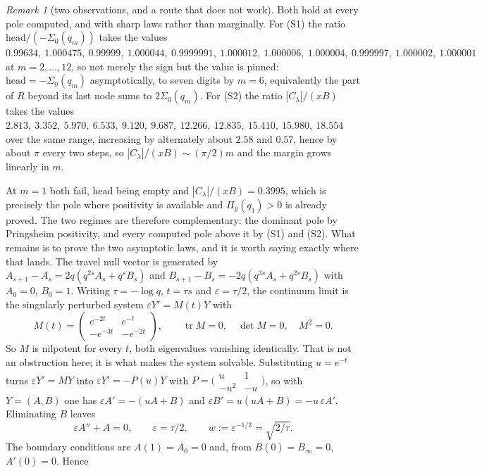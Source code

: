 \documentclass[11pt]{article}
\theoremstyle{definition}
\theoremstyle{remark}
\newtheorem{remark}[theorem]{Remark}
\theoremstyle{definition}
\begin{document}
\begin{remark}[two observations, and a route that does not work]
Both hold at every pole computed, and with sharp laws rather than marginally. For (S1) the ratio
$\text{head}/(-\Sigma_0(q_m))$ takes the values
$0.99634,\ 1.000475,\ 0.99999,\ 1.000044,\ 0.9999991,\ 1.000012,\ 1.000006,\ 1.000004,\
0.999997,\ 1.000002,\ 1.000001$ at $m=2,\dots,12$, so not merely the sign but the value is
pinned: $\text{head}=-\Sigma_0(q_m)$ asymptotically, to seven digits by $m=6$, equivalently the
part of $R$ beyond its last node sums to $2\Sigma_0(q_m)$. For (S2) the ratio $|C_\lambda|/(xB)$
takes the values $2.813,\ 3.352,\ 5.970,\ 6.533,\ 9.120,\ 9.687,\ 12.266,\ 12.835,\ 15.410,\
15.980,\ 18.554$ over the same range, increasing by alternately about $2.58$ and $0.57$, hence by
about $\pi$ every two steps, so $|C_\lambda|/(xB)\sim(\pi/2)m$ and the margin grows linearly in
$m$.

At $m=1$ both fail, $\text{head}$ being empty and $|C_\lambda|/(xB)=0.3995$, which is precisely
the pole where positivity is available and $\Pi_y(q_1)>0$ is already proved. The two regimes are
therefore complementary: the dominant pole by Pringsheim positivity, and every computed pole above
it by (S1) and (S2). What remains is to prove the two asymptotic laws, and it is worth saying exactly where that
lands. The travel null vector is generated by $A_{s+1}-A_s=2q(q^{2s}A_s+q^sB_s)$ and
$B_{s+1}-B_s=-2q(q^{3s}A_s+q^{2s}B_s)$ with $A_0=0$, $B_0=1$. Writing $\tau=-\log q$, $t=\tau s$
and $\varepsilon=\tau/2$, the continuum limit is the singularly perturbed system
$\varepsilon Y'=M(t)Y$ with
\[
   M(t)=\begin{pmatrix} e^{-2t} & e^{-t}\\ -e^{-3t} & -e^{-2t}\end{pmatrix},
   \qquad \operatorname{tr}M=0,\quad \det M=0,\quad M^2=0 .
\]
So $M$ is nilpotent for every $t$, both eigenvalues vanishing identically. That is not an
obstruction here; it is what makes the system solvable. Substituting $u=e^{-t}$ turns
$\varepsilon Y'=MY$ into $\varepsilon Y'=-P(u)Y$ with
$P=\bigl(\begin{smallmatrix}u&1\\-u^2&-u\end{smallmatrix}\bigr)$, so with $Y=(A,B)$ one has
$\varepsilon A'=-(uA+B)$ and $\varepsilon B'=u(uA+B)=-u\,\varepsilon A'$. Eliminating $B$ leaves
\begin{equation}\label{eq:oscillator}
   \varepsilon A''+A=0,\qquad \varepsilon=\tau/2,\qquad w:=\varepsilon^{-1/2}=\sqrt{2/\tau} .
\end{equation}
The boundary conditions are $A(1)=A_0=0$ and, from $B(0)=B_\infty=0$, $A'(0)=0$. Hence

\end{remark}
\end{document}
